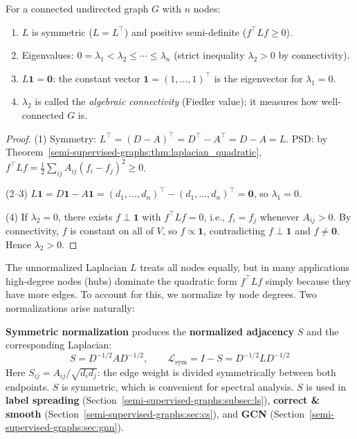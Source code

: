 \begin{notechapter}
\begin{proposition}
\label{semi-supervised-graphs:prop:laplacian_properties}
For a connected undirected graph $G$ with $n$ nodes:
\begin{enumerate}
    \item $L$ is symmetric ($L = L^\top$) and positive semi-definite
      ($f^\top Lf \geq 0$).
    \item Eigenvalues: $0 = \lambda_1 < \lambda_2 \leq \cdots \leq \lambda_n$
      (strict inequality $\lambda_2 > 0$ by connectivity).
    \item $L\mathbf{1} = \mathbf{0}$: the constant vector
      $\mathbf{1} = (1,\ldots,1)^\top$ is the eigenvector for $\lambda_1 = 0$.
    \item $\lambda_2$ is called the \emph{algebraic connectivity}
      (Fiedler value); it measures how well-connected $G$ is.
\end{enumerate}
\end{proposition}

\begin{proof}
(1) Symmetry: $L^\top = (D-A)^\top = D^\top - A^\top = D - A = L$.
PSD: by Theorem~\ref{semi-supervised-graphs:thm:laplacian_quadratic},
$f^\top Lf = \frac{1}{2}\sum_{ij}A_{ij}(f_i - f_j)^2 \geq 0$.

(2--3) $L\mathbf{1} = D\mathbf{1} - A\mathbf{1} = (d_1,\ldots,d_n)^\top
- (d_1,\ldots,d_n)^\top = \mathbf{0}$, so $\lambda_1 = 0$.

(4) If $\lambda_2 = 0$, there exists $f \perp \mathbf{1}$ with
$f^\top Lf = 0$, i.e., $f_i = f_j$ whenever $A_{ij} > 0$. By connectivity,
$f$ is constant on all of $V$, so $f \propto \mathbf{1}$, contradicting
$f \perp \mathbf{1}$ and $f \neq \mathbf{0}$. Hence $\lambda_2 > 0$.
\end{proof}

\begin{definition}
\label{semi-supervised-graphs:def:normalized_laplacians}
The unnormalized Laplacian $L$ treats all nodes equally, but in many
applications high-degree nodes (hubs) dominate the quadratic form $f^\top Lf$
simply because they have more edges. To account for this, we normalize by node
degrees. Two normalizations arise naturally:

\textbf{Symmetric normalization} produces the \textbf{normalized adjacency}
$S$ and the corresponding Laplacian:
\begin{equation}
S = D^{-1/2}AD^{-1/2}, \qquad
\mathcal{L}_{\mathrm{sym}} = I - S = D^{-1/2}LD^{-1/2}
\end{equation}
Here $S_{ij} = A_{ij}/\sqrt{d_id_j}$: the edge weight is divided
symmetrically between both endpoints. $S$ is symmetric, which is convenient
for spectral analysis. $S$ is used in \textbf{label spreading}
(Section~\ref{semi-supervised-graphs:subsec:ls}), \textbf{correct \& smooth} (Section~\ref{semi-supervised-graphs:sec:cs}),
and \textbf{GCN} (Section~\ref{semi-supervised-graphs:sec:gnn}).


\end{definition}
\end{notechapter}
